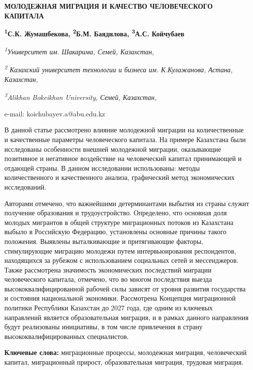 \begin{articleheader}
{\bfseries МОЛОДЕЖНАЯ МИГРАЦИЯ И КАЧЕСТВО ЧЕЛОВЕЧЕСКОГО КАПИТАЛА}

{\bfseries
\textsuperscript{1}С.К. Жумашбекова,
\textsuperscript{2}Б.М. Баядилова,
\textsuperscript{3}А.С. Койчубаев\textsuperscript{\envelope }}
\end{articleheader}

\begin{affiliation}
\emph{\textsuperscript{1}Университет им. Шакарима, Семей, Казахстан,}

\emph{\textsuperscript{2} Казахский университет технологии и бизнеса им. К.Кулажанова, Астана, Казахстан,}

\emph{\textsuperscript{3}Alikhan Bokeikhan University, Семей, Казахстан,}

e-mail: koichubayev.a@abu.edu.kz
\end{affiliation}

В данной статье рассмотрено влияние молодежной миграции на
количественные и качественные параметры человеческого капитала. На
примере Казахстана были исследованы особенности внешней молодежной
миграции, оказывающие позитивное и негативное воздействие на
человеческий капитал принимающей и отдающей страны. В данном
исследовании использованы: методы количественного и качественного
анализа, графический метод экономических исследований.

Авторами отмечено, что важнейшими детерминантами выбытия из страны
служит получение образования и трудоустройство. Определено, что основная
доля молодых мигрантов в общей структуре миграционных потоков из
Казахстана выбыло в Российскую Федерацию, установлены основные причины
такого положения. Выявлены выталкивающие и притягивающие факторы,
стимулирующие миграцию молодежи путем интервьюирования респондентов,
находящихся за рубежом с использованием социальных сетей и мессенджеров.
Также рассмотрена значимость экономических последствий миграции
человеческого капитала, отмечено, что во многом последствия выезда
высококвалифицированной рабочей силы зависят от уровня развития
государства и состояния национальной экономики. Рассмотрена Концепция
миграционной политики Республики Казахстан до 2027 года, где одним из
ключевых направлений является образовательная миграция, и в рамках
данного направления будут реализованы инициативы, в том числе
привлечения в страну высококвалифицированных специалистов.

{\bfseries Ключевые слова:} миграционные процессы, молодежная миграция,
человеческий капитал, миграционный прирост, образовательная миграция,
трудовая миграция.

